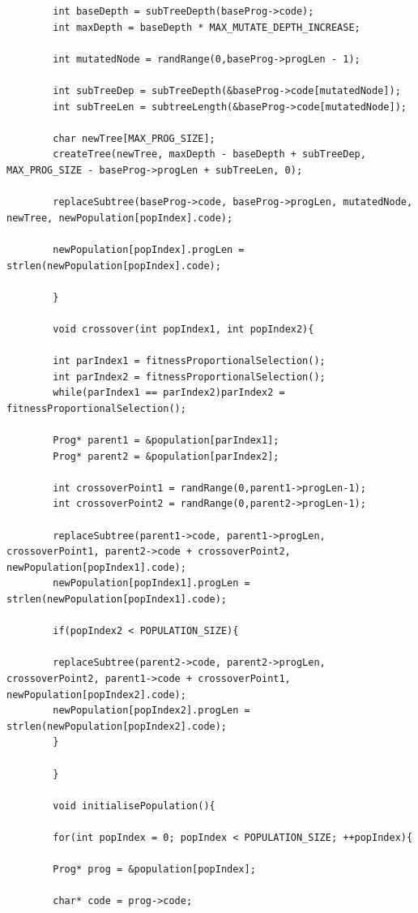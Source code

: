 \documentclass{article}
\begin{document}
\begin{lstlisting}
	    int baseDepth = subTreeDepth(baseProg->code);
	    int maxDepth = baseDepth * MAX_MUTATE_DEPTH_INCREASE;
	    
	    int mutatedNode = randRange(0,baseProg->progLen - 1);
	    
	    int subTreeDep = subTreeDepth(&baseProg->code[mutatedNode]);
	    int subTreeLen = subtreeLength(&baseProg->code[mutatedNode]);
	    
	    char newTree[MAX_PROG_SIZE];
	    createTree(newTree, maxDepth - baseDepth + subTreeDep, MAX_PROG_SIZE - baseProg->progLen + subTreeLen, 0);
	    
	    replaceSubtree(baseProg->code, baseProg->progLen, mutatedNode, newTree, newPopulation[popIndex].code);
	    
	    newPopulation[popIndex].progLen = strlen(newPopulation[popIndex].code);
	    
	    } 
	    
	    void crossover(int popIndex1, int popIndex2){
	    
	    int parIndex1 = fitnessProportionalSelection();
	    int parIndex2 = fitnessProportionalSelection();
	    while(parIndex1 == parIndex2)parIndex2 = fitnessProportionalSelection();
	    
	    Prog* parent1 = &population[parIndex1];
	    Prog* parent2 = &population[parIndex2];
	    
	    int crossoverPoint1 = randRange(0,parent1->progLen-1);
	    int crossoverPoint2 = randRange(0,parent2->progLen-1);
	    
	    replaceSubtree(parent1->code, parent1->progLen, crossoverPoint1, parent2->code + crossoverPoint2, newPopulation[popIndex1].code);
	    newPopulation[popIndex1].progLen = strlen(newPopulation[popIndex1].code);
	    
	    if(popIndex2 < POPULATION_SIZE){
	    
	    replaceSubtree(parent2->code, parent2->progLen, crossoverPoint2, parent1->code + crossoverPoint1, newPopulation[popIndex2].code);
	    newPopulation[popIndex2].progLen = strlen(newPopulation[popIndex2].code);
	    }
	    
	    }
	    
	    void initialisePopulation(){
	    
	    for(int popIndex = 0; popIndex < POPULATION_SIZE; ++popIndex){
	    
	    Prog* prog = &population[popIndex];
	    
	    char* code = prog->code;
	    

\end{lstlisting}
\end{document}
